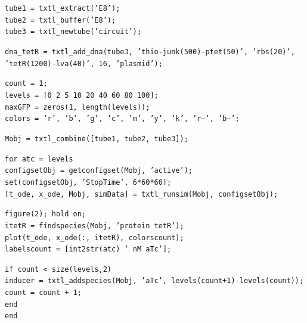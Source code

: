 \documentclass[english]{report}
\begin{document}
\noindent \texttt{tube1 = txtl\_extract('E8');} \\
\texttt{tube2 = txtl\_buffer('E8');} \\
\texttt{tube3 = txtl\_newtube('circuit');} 
\vspace*{1\baselineskip}
								
\noindent \texttt{dna\_tetR = txtl\_add\_dna(tube3, 'thio-junk(500)-ptet(50)', 'rbs(20)', 'tetR(1200)-lva(40)', 16, 'plasmid'); }
\vspace*{1\baselineskip}
								
\noindent \texttt{count = 1;}\\
\texttt{levels = [0 2 5 10 20 40 60 80 100];}\\
\texttt{maxGFP = zeros(1, length(levels));}\\
\texttt{colors = {'r', 'b', 'g', 'c', 'm', 'y', 'k', 'r--', 'b--'};}
\vspace*{1\baselineskip}
								
\noindent \texttt{Mobj = txtl\_combine([tube1, tube2, tube3]);}
\vspace*{1\baselineskip}
								
\noindent \texttt{for atc = levels }\\
 \texttt{configsetObj = getconfigset(Mobj, 'active');}\\
  \texttt{set(configsetObj, 'StopTime', 6*60*60);  }\\
  \texttt{[t\_ode, x\_ode, Mobj, simData] = txtl\_runsim(Mobj, configsetObj); }
\vspace*{1\baselineskip}
								
\noindent \texttt{figure(2); hold on;}\\
  \texttt{itetR = findspecies(Mobj, 'protein tetR');}\\
  \texttt{plot(t\_ode, x\_ode(:, itetR), colors{count});}\\
  \texttt{labels{count} = [int2str(atc) ' nM aTc'];}
								\vspace*{1\baselineskip}
								
  \noindent \texttt{if count < size(levels,2)}\\
  \texttt{inducer = txtl\_addspecies(Mobj, 'aTc', levels(count+1)-levels(count));}\\
  \texttt{count = count + 1;}\\
  \texttt{end}\\
\texttt{end}
	\vspace*{1\baselineskip}
								
\end{document}
